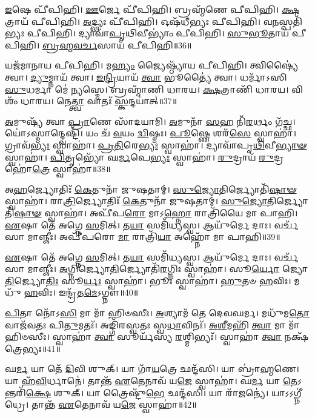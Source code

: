 \-\ul{𑌇}\-𑌷𑍇 𑌪𑍀᳴𑌪𑌿𑌹𑌿। 
\-\ul{𑌊}\-𑌰𑍍𑌜𑍇 𑌪𑍀᳴𑌪𑌿𑌹𑌿। 
𑌬𑍍𑌰𑌹𑍍𑌮᳴𑌣𑍇 𑌪𑍀𑌪𑌿𑌹𑌿। 
\-\ul{𑌕𑍍𑌷}\-𑌤𑍍𑌰𑌾𑌯᳴ 𑌪𑍀𑌪𑌿𑌹𑌿। 
\-\ul{𑌅}\-𑌦𑍍𑌭𑍍𑌯𑌃 𑌪𑍀᳴𑌪𑌿𑌹𑌿। 
𑌓𑌷᳴𑌧𑍀𑌭𑍍𑌯𑌃 𑌪𑍀𑌪𑌿𑌹𑌿। 
𑌵\-\ul{𑌨}\-𑌸𑍍𑌪𑌤𑌿᳴𑌭𑍍𑌯𑌃 𑌪𑍀𑌪𑌿𑌹𑌿। 
𑌦𑍍𑌯𑌾𑌵𑌾᳴\-\ul{𑌪𑍃}\-𑌥𑌿𑌵𑍀𑌭𑍍𑌯𑌾𑌂॑ 𑌪𑍀𑌪𑌿𑌹𑌿। 
\-\ul{𑌸𑍁}\-\-\ul{𑌭𑍂}\-𑌤𑌾𑌯᳴ 𑌪𑍀𑌪𑌿𑌹𑌿। 
\-\ul{𑌬𑍍𑌰}\-\-\ul{𑌹𑍍𑌮}\-\-\ul{𑌵}\-\-\ul{𑌰𑍍𑌚}\-𑌸𑌾𑌯᳴ 𑌪𑍀𑌪𑌿𑌹𑌿॥36॥

𑌯𑌜᳴𑌮𑌾𑌨𑌾𑌯 𑌪𑍀𑌪𑌿𑌹𑌿। 
𑌮\-\ul{𑌹𑍍𑌯𑌂} 𑌜𑍍𑌯𑍈𑌷𑍍𑌠𑍍𑌯𑌾᳴𑌯 𑌪𑍀𑌪𑌿𑌹𑌿। 
𑌤𑍍𑌵𑌿𑌷𑍍𑌯𑍈॑ 𑌤𑍍𑌵𑌾। 
\-\ul{𑌦𑍍𑌯𑍁}\-𑌮𑍍𑌨𑌾𑌯᳴ 𑌤𑍍𑌵𑌾। 
\-\ul{𑌇}\-\-\ul{𑌨𑍍𑌦𑍍𑌰𑌿}\-𑌯𑌾𑌯᳴ \ul{𑌤𑍍𑌵𑌾} 𑌭𑍂𑌤𑍍𑌯𑍈॑ 𑌤𑍍𑌵𑌾। 
𑌧𑌰𑍍𑌮𑌾᳴𑌽𑌸𑌿 \ul{𑌸𑍁}\-𑌧𑌰𑍍𑌮𑌾 𑌮𑍇॑ \ul{𑌨𑍍𑌯}\-𑌸𑍍𑌮𑍇। 
𑌬𑍍𑌰𑌹𑍍𑌮𑌾᳴𑌣𑌿 𑌧𑌾𑌰𑌯। 
\-\ul{𑌕𑍍𑌷}\-𑌤𑍍𑌰𑌾𑌣𑌿᳴ 𑌧𑌾𑌰𑌯। 
𑌵𑌿𑌶𑌂᳴ 𑌧𑌾𑌰𑌯। 
𑌨𑍇\-\ul{𑌤𑍍𑌤𑍍𑌵𑌾} 𑌵𑌾𑌤𑌃᳴ \ul{𑌸𑍍𑌕}\-𑌨𑍍𑌦𑌯𑌾॑𑌤𑍍॥37॥

\-\ul{𑌅}\-𑌮𑍁𑌷𑍍𑌯᳴ 𑌤𑍍𑌵𑌾 \ul{𑌪𑍍𑌰𑌾}\-𑌣𑍇 𑌸𑌾᳴𑌦𑌯𑌾𑌮𑌿। 
\-\ul{𑌅}\-𑌮𑍁𑌨𑌾᳴ \ul{𑌸}\-𑌹 𑌨𑌿᳴\-\ul{𑌰}\-𑌰𑍍𑌥𑌂 𑌗᳴𑌚𑍍𑌛। 
𑌯𑍋॑𑌽𑌸𑍍𑌮𑌾𑌨𑍍𑌦𑍍𑌵𑍇𑌷𑍍𑌟𑌿᳴। 
𑌯𑌂 𑌚᳴ \ul{𑌵}\-𑌯𑌂 \ul{𑌦𑍍𑌵𑌿}\-𑌷𑍍𑌮𑌃। 
\-\ul{𑌪𑍂}\-𑌷𑍍𑌣𑍇 𑌶𑌰᳴\-\ul{𑌸𑍇} 𑌸𑍍𑌵𑌾𑌹𑌾॑। 
𑌗𑍍𑌰𑌾𑌵᳴\-\ul{𑌭𑍍𑌯𑌃} 𑌸𑍍𑌵𑌾𑌹𑌾॑। 
\-\ul{𑌪𑍍𑌰}\-\-\ul{𑌤𑌿}\-𑌰𑍇\-\ul{𑌭𑍍𑌯𑌃} 𑌸𑍍𑌵𑌾𑌹𑌾॑। 
𑌦𑍍𑌯𑌾𑌵𑌾᳴𑌪𑍃\-\ul{𑌥𑌿}\-𑌵𑍀\-\ul{𑌭𑍍𑌯𑌾}\-\-\ul{𑍟} 𑌸𑍍𑌵𑌾𑌹𑌾॑। 
\-\ul{𑌪𑌿}\-𑌤𑍃𑌭𑍍𑌯𑍋᳴ 𑌘\-\ul{𑌰𑍍𑌮}\-𑌪𑍇\-\ul{𑌭𑍍𑌯𑌃} 𑌸𑍍𑌵𑌾𑌹𑌾॑। 
\-\ul{𑌰𑍁}\-𑌦𑍍𑌰𑌾𑌯᳴ \ul{𑌰𑍁}\-𑌦𑍍𑌰𑌹𑍋॑\-\ul{𑌤𑍍𑌰𑍇} 𑌸𑍍𑌵𑌾𑌹𑌾॑॥38॥

𑌅\-\ul{𑌹}\-𑌰𑍍𑌜𑍍𑌯𑍋𑌤𑌿𑌃᳴ \ul{𑌕𑍇}\-𑌤𑍁𑌨𑌾᳴ 𑌜𑍁𑌷𑌤𑌾𑌮𑍍। 
\-\ul{𑌸𑍁}\-\-\ul{𑌜𑍍𑌯𑍋}\-𑌤𑌿𑌰𑍍𑌜𑍍𑌯𑍋𑌤𑌿᳴\-\ul{𑌷𑌾}\-\-\ul{𑍟} 𑌸𑍍𑌵𑌾𑌹𑌾॑। 
𑌰𑌾\-\ul{𑌤𑍍𑌰𑌿}\-𑌰𑍍𑌜𑍍𑌯𑍋𑌤𑌿𑌃᳴ \ul{𑌕𑍇}\-𑌤𑍁𑌨𑌾᳴ 𑌜𑍁𑌷𑌤𑌾𑌮𑍍। 
\-\ul{𑌸𑍁}\-\-\ul{𑌜𑍍𑌯𑍋}\-𑌤𑌿𑌰𑍍𑌜𑍍𑌯𑍋𑌤𑌿᳴\-\ul{𑌷𑌾}\-\-\ul{𑍟} 𑌸𑍍𑌵𑌾𑌹𑌾॑। 
𑌅𑌪𑍀᳴𑌪\-\ul{𑌰𑍋} 𑌮𑌾𑌽\-\ul{𑌹𑍍𑌨𑍋} 𑌰𑌾𑌤𑍍𑌰𑌿᳴𑌯𑍈 𑌮𑌾 𑌪𑌾𑌹𑌿। 
\-\ul{𑌏}\-𑌷𑌾 𑌤𑍇᳴ 𑌅𑌗𑍍𑌨𑍇 \ul{𑌸}\-𑌮𑌿𑌤𑍍। 
𑌤\-\ul{𑌯𑌾} 𑌸𑌮𑌿᳴𑌧𑍍𑌯𑌸𑍍𑌵। 
𑌆𑌯𑍁᳴𑌰𑍍𑌮𑍇 𑌦𑌾𑌃। 
𑌵𑌰𑍍𑌚᳴𑌸𑌾 𑌮𑌾𑌞𑍍𑌜𑍀𑌃। 
𑌅𑌪𑍀᳴𑌪𑌰𑍋 \ul{𑌮𑌾} 𑌰𑌾𑌤𑍍𑌰𑌿᳴\-\ul{𑌯𑌾} 𑌅𑌹𑍍𑌨𑍋᳴ 𑌮𑌾 𑌪𑌾𑌹𑌿॥39॥

\-\ul{𑌏}\-𑌷𑌾 𑌤𑍇᳴ 𑌅𑌗𑍍𑌨𑍇 \ul{𑌸}\-𑌮𑌿𑌤𑍍। 
𑌤\-\ul{𑌯𑌾} 𑌸𑌮𑌿᳴𑌧𑍍𑌯𑌸𑍍𑌵। 
𑌆𑌯𑍁᳴𑌰𑍍𑌮𑍇 𑌦𑌾𑌃। 
𑌵𑌰𑍍𑌚᳴𑌸𑌾 𑌮𑌾𑌞𑍍𑌜𑍀𑌃। 
\-\ul{𑌅}\-𑌗𑍍𑌨𑌿𑌰𑍍𑌜𑍍𑌯𑍋\-\ul{𑌤𑌿}\-𑌰𑍍𑌜𑍍𑌯𑍋𑌤𑌿᳴\-\ul{𑌰}\-𑌗𑍍𑌨𑌿𑌃 𑌸𑍍𑌵𑌾𑌹𑌾॑। 
𑌸𑍂\-\ul{𑌰𑍍𑌯𑍋} 𑌜𑍍𑌯𑍋\-\ul{𑌤𑌿}\-𑌰𑍍𑌜𑍍𑌯𑍋\-\ul{𑌤𑌿𑌃} 𑌸𑍂\-\ul{𑌰𑍍𑌯𑌃} 𑌸𑍍𑌵𑌾𑌹𑌾॑। 
𑌭𑍂𑌃 𑌸𑍍𑌵𑌾𑌹𑌾॑। 
\-\ul{𑌹𑍁}\-𑌤𑍞 \ul{𑌹}\-𑌵𑌿𑌃। 
𑌮𑌧𑍁᳴ \ul{𑌹}\-𑌵𑌿𑌃। 
𑌇𑌨𑍍𑌦𑍍𑌰᳴𑌤\-\ul{𑌮𑍇}\-𑌽𑌗𑍍𑌨𑍗॥40॥

\-\ul{𑌪𑌿}\-𑌤𑌾 𑌨𑍋᳴𑌽\-\ul{𑌸𑌿} 𑌮𑌾 𑌮𑌾᳴ 𑌹𑌿𑍞𑌸𑍀𑌃। 
\-\ul{𑌅}\-𑌶𑍍𑌯𑌾𑌮᳴ 𑌤𑍇 𑌦𑍇𑌵𑌘𑌰𑍍𑌮। 
𑌮𑌧𑍁᳴𑌮\-\ul{𑌤𑍋} 𑌵𑌾𑌜᳴𑌵𑌤𑌃 𑌪𑌿\-\ul{𑌤𑍁}\-𑌮𑌤𑌃᳴। 
𑌅𑌙𑍍𑌗𑌿᳴𑌰𑌸𑍍𑌵𑌤𑌃 𑌸𑍍𑌵\-\ul{𑌧𑌾}\-𑌵𑌿𑌨𑌃᳴। 
\-\ul{𑌅}\-\-\ul{𑌶𑍀}\-𑌮𑌹𑌿᳴ \ul{𑌤𑍍𑌵𑌾} 𑌮𑌾 𑌮𑌾᳴ 𑌹𑌿𑍞𑌸𑍀𑌃। 
𑌸𑍍𑌵𑌾𑌹𑌾॑ \ul{𑌤𑍍𑌵𑌾} 𑌸𑍂𑌰𑍍𑌯᳴𑌸𑍍𑌯 \ul{𑌰}\-𑌶𑍍𑌮𑌿𑌭𑍍𑌯𑌃᳴। 
𑌸𑍍𑌵𑌾𑌹𑌾॑ \ul{𑌤𑍍𑌵𑌾} 𑌨𑌕𑍍𑌷᳴𑌤𑍍𑌰𑍇𑌭𑍍𑌯𑌃॥41॥%
\anuvakamend[\-\ul{𑌬𑍍𑌰}\-\-\ul{𑌹𑍍𑌮}\-\-\ul{𑌵}\-\-\ul{𑌰𑍍𑌚}\-𑌸𑌾𑌯᳴ 𑌪𑍀𑌪𑌿𑌹𑌿 \ul{𑌸𑍍𑌕}\-𑌨𑍍𑌦𑌯𑌾॑\-\ul{𑌦𑍍𑌰𑍁}\-𑌦𑍍𑌰𑌾𑌯᳴ \ul{𑌰𑍁}\-𑌦𑍍𑌰𑌹𑍋॑\-\ul{𑌤𑍍𑌰𑍇} 𑌸𑍍𑌵𑌾𑌹𑌾𑌽𑌹𑍍𑌨𑍋᳴ 𑌮𑌾 𑌪𑌾\-\ul{𑌹𑍍𑌯}\-𑌗𑍍𑌨𑍗 \ul{𑌸}\-𑌪𑍍𑌤 𑌚᳴]

𑌘\-\ul{𑌰𑍍𑌮} 𑌯𑌾 𑌤𑍇᳴ \ul{𑌦𑌿}\-𑌵𑌿 𑌶𑍁𑌕𑍍। 
𑌯𑌾 𑌗𑌾᳴\-\ul{𑌯}\-𑌤𑍍𑌰𑍇 𑌛𑌨𑍍𑌦᳴𑌸𑌿। 
𑌯𑌾 𑌬𑍍𑌰𑌾॑\-\ul{𑌹𑍍𑌮}\-𑌣𑍇। 
𑌯𑌾 𑌹᳴\-\ul{𑌵𑌿}\-𑌰𑍍𑌧𑌾𑌨𑍇॑। 
𑌤𑌾𑌨𑍍𑌤᳴ \ul{𑌏}\-𑌤𑍇𑌨𑌾𑌵᳴ 𑌯\-\ul{𑌜𑍇} 𑌸𑍍𑌵𑌾𑌹𑌾॑। 
𑌘\-\ul{𑌰𑍍𑌮} 𑌯𑌾 \ul{𑌤𑍇}\-𑌽𑌨𑍍𑌤𑌰𑌿᳴\-\ul{𑌕𑍍𑌷𑍇} 𑌶𑍁𑌕𑍍। 
𑌯𑌾 𑌤𑍍𑌰𑍈𑌷𑍍𑌟𑍁᳴\-\ul{𑌭𑍇} 𑌛𑌨𑍍𑌦᳴𑌸𑌿। 
𑌯𑌾 𑌰𑌾᳴\-\ul{𑌜}\-𑌨𑍍𑌯𑍇॑। 
𑌯𑌾𑌽𑌽𑌗𑍍𑌨𑍀॑𑌧𑍍𑌰𑍇। 
𑌤𑌾𑌨𑍍𑌤᳴ \ul{𑌏}\-𑌤𑍇𑌨𑌾𑌵᳴ 𑌯\-\ul{𑌜𑍇} 𑌸𑍍𑌵𑌾𑌹𑌾॑॥42॥

